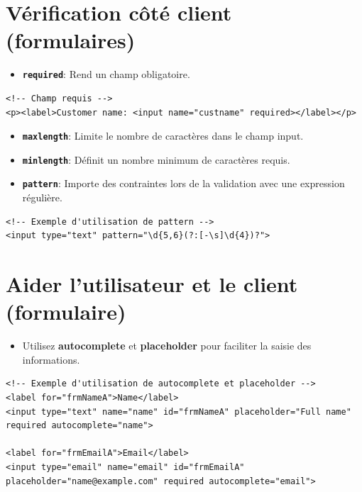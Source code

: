 \documentclass{report}
\begin{document}
\begin{multicols*}{2}
\section{Vérification côté client (formulaires)}

\begin{itemize}
    \item \textbf{\texttt{required}}: Rend un champ obligatoire.
\end{itemize}

\begin{lstlisting}[style=HTMLDraculaDark]
<!-- Champ requis -->
<p><label>Customer name: <input name="custname" required></label></p>
\end{lstlisting}

\begin{itemize}
    \item \textbf{\texttt{maxlength}}: Limite le nombre de caractères dans le champ input.
    \item \textbf{\texttt{minlength}}: Définit un nombre minimum de caractères requis.
    \item \textbf{\texttt{pattern}}: Importe des contraintes lors de la validation avec une expression régulière.
\end{itemize}

\begin{lstlisting}[style=HTMLDraculaDark]
<!-- Exemple d'utilisation de pattern -->
<input type="text" pattern="\d{5,6}(?:[-\s]\d{4})?">
\end{lstlisting}


\section{Aider l'utilisateur et le client (formulaire)}

\begin{itemize}
    \item Utilisez \textbf{autocomplete} et \textbf{placeholder} pour faciliter la saisie des informations.
\end{itemize}

\begin{lstlisting}[style=HTMLDraculaDark]
<!-- Exemple d'utilisation de autocomplete et placeholder -->
<label for="frmNameA">Name</label>
<input type="text" name="name" id="frmNameA" placeholder="Full name" required autocomplete="name">

<label for="frmEmailA">Email</label>
<input type="email" name="email" id="frmEmailA" placeholder="name@example.com" required autocomplete="email">


\end{lstlisting}
\end{multicols*}
\end{document}
